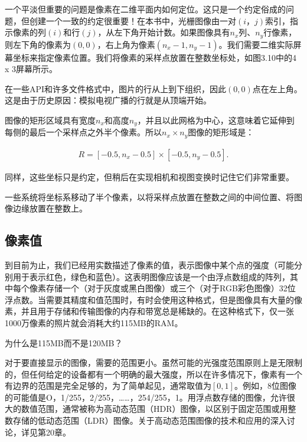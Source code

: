 \documentclass[lang=cn,12pt]{elegantbook}
\begin{document}
一个平淡但重要的问题是像素在二维平面内如何定位。这只是一个约定俗成的问题，但创建一个一致的约定很重要！在本书中，光栅图像由一对$(i，j)$索引，指示像素的列$(i)$和行$(j)$，从左下角开始计数。如果图像具有$n_x$列、$n_y$行像素，则左下角的像素为$(0,0)$，右上角为像素$(n_x-1,n_y-1)$。我们需要二维实际屏幕坐标来指定像素位置。我们将像素的采样点放置在整数坐标处，如图3.10中的4 x 3屏幕所示。

\begin{note}
  在一些API和许多文件格式中，图片的行从上到下组织，因此$(0,0)$点在左上角。这是由于历史原因：模拟电视广播的行就是从顶端开始。
\end{note}

图像的矩形区域具有宽度$n_x$和高度$n_y$，并且以此网格为中心，这意味着它延伸到每侧的最后一个采样点之外半个像素。所以$n_x \times n_y$图像的矩形域是：

\[
  \begin{aligned}
    R=[-0.5,n_x-0.5]\times [-0.5,n_y-0.5].
  \end{aligned}
\]

同样，这些坐标只是约定，但稍后在实现相机和视图变换时记住它们非常重要。

\begin{note}
  一些系统将坐标系移动了半个像素，以将采样点放置在整数之间的中间位置、将图像边缘放置在整数上。
\end{note}

\subsection{像素值}

到目前为止，我们已经用实数描述了像素的值，表示图像中某个点的强度（可能分别用于表示红色，绿色和蓝色）。这表明图像应该是一个由浮点数组成的阵列，其中每个像素存储一个（对于灰度或黑白图像）或三个（对于RGB彩色图像）32位浮点数。当需要其精度和值范围时，有时会使用这种格式，但是图像具有大量的像素，并且用于存储和传输图像的内存和带宽总是稀缺的。在这种格式下，仅一张1000万像素的照片就会消耗大约115MB的RAM。

\begin{note}
  为什么是115MB而不是120MB？
\end{note}

对于要直接显示的图像，需要的范围更小。虽然可能的光强度范围原则上是无限制的，但任何给定的设备都有一个明确的最大强度，所以在许多情况下，像素有一个有边界的范围是完全足够的，为了简单起见，通常取值为$[0,1]$。例如，8位图像的可能值是O，1/255，2/255，……，254/255，1。用浮点数存储的图像，允许很大的数值范围，通常被称为高动态范围（HDR）图像，以区别于固定范围或用整数存储的低动态范围（LDR）图像。关于高动态范围图像的技术和应用的深入讨论，详见第20章。
\end{document}
